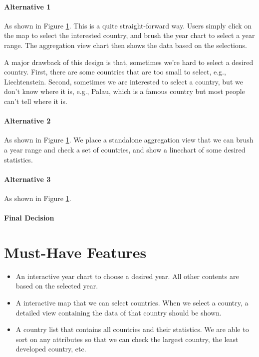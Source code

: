 \documentclass[12pt, fullpage,letterpaper]{article}
\begin{document}
\paragraph{Alternative 1}
As shown in Figure \ref{}. 
This is a quite straight-forward way.
Users simply click on the map to select the interested country,
and brush the year chart to select a year range.
The aggregation view chart then shows the data based on the selections.

A major drawback of this design is that, sometimes we're hard to select a desired country.
First, there are some countries that are too small to select, e.g., Liechtenstein. Second, sometimes we are interested to select
a country, but we don't know where it is, e.g., Palau, which is a famous country but most people can't tell where it is.

\paragraph{Alternative 2}
As shown in Figure \ref{}.
We place a standalone aggregation view that we can brush a year range and check a set of countries, and
show a linechart of some desired statistics.

\paragraph{Alternative 3}
As shown in Figure \ref{}.

\paragraph{Final Decision}




\section{Must-Have Features}
\begin{itemize}
    \item An interactive year chart to choose a desired year. All other contents are based on the selected year.
    \item A interactive map that we can select countries. When we select a country, a detailed view containing the data of that country should be shown.
    \item A country list that contains all countries and their statistics. We are able to sort on any attributes so that we can check the largest country, the least developed country, etc.
\end{itemize}
\end{document}
